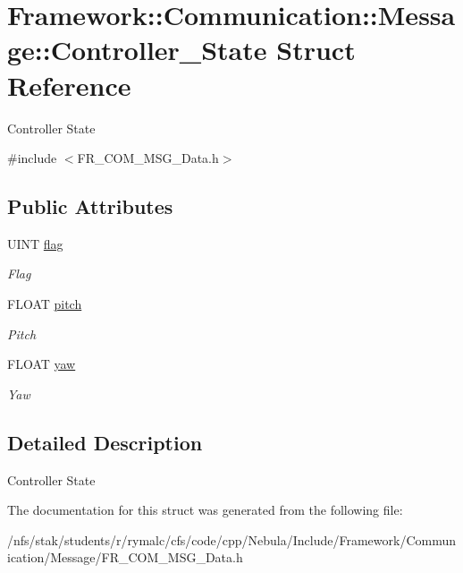 \hypertarget{structFramework_1_1Communication_1_1Message_1_1Controller__State}{
\section{Framework::Communication::Message::Controller\_\-State Struct Reference}
\label{structFramework_1_1Communication_1_1Message_1_1Controller__State}
}


Controller State  


{\ttfamily \#include $<$FR\_\-COM\_\-MSG\_\-Data.h$>$}\subsection*{Public Attributes}
\begin{DoxyCompactItemize}
\item 
\hypertarget{structFramework_1_1Communication_1_1Message_1_1Controller__State_a9cbd8f816e59bc585d60828a3ef1ef45}{
UINT \hyperlink{structFramework_1_1Communication_1_1Message_1_1Controller__State_a9cbd8f816e59bc585d60828a3ef1ef45}{flag}}
\label{structFramework_1_1Communication_1_1Message_1_1Controller__State_a9cbd8f816e59bc585d60828a3ef1ef45}

\begin{DoxyCompactList}\small\item\em Flag \item\end{DoxyCompactList}\item 
\hypertarget{structFramework_1_1Communication_1_1Message_1_1Controller__State_a474e67e70f4f3f7e33047df713c5df0e}{
FLOAT \hyperlink{structFramework_1_1Communication_1_1Message_1_1Controller__State_a474e67e70f4f3f7e33047df713c5df0e}{pitch}}
\label{structFramework_1_1Communication_1_1Message_1_1Controller__State_a474e67e70f4f3f7e33047df713c5df0e}

\begin{DoxyCompactList}\small\item\em Pitch \item\end{DoxyCompactList}\item 
\hypertarget{structFramework_1_1Communication_1_1Message_1_1Controller__State_a2fe5bfe16fd74cb85ebf03295027e0aa}{
FLOAT \hyperlink{structFramework_1_1Communication_1_1Message_1_1Controller__State_a2fe5bfe16fd74cb85ebf03295027e0aa}{yaw}}
\label{structFramework_1_1Communication_1_1Message_1_1Controller__State_a2fe5bfe16fd74cb85ebf03295027e0aa}

\begin{DoxyCompactList}\small\item\em Yaw \item\end{DoxyCompactList}\end{DoxyCompactItemize}


\subsection{Detailed Description}
Controller State 

The documentation for this struct was generated from the following file:\begin{DoxyCompactItemize}
\item 
/nfs/stak/students/r/rymalc/cfs/code/cpp/Nebula/Include/Framework/Communication/Message/FR\_\-COM\_\-MSG\_\-Data.h\end{DoxyCompactItemize}
